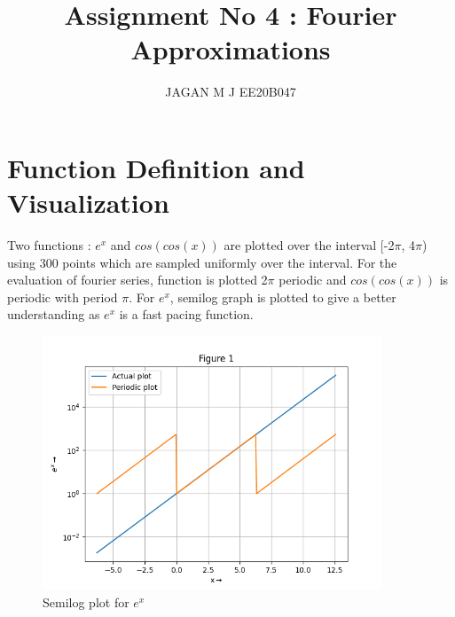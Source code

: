 \documentclass[10pt,a4paper]{article}
\date{}
\begin{document}
\title{Assignment No 4 : Fourier Approximations}
\author{JAGAN M J EE20B047}
\maketitle


\section{Function Definition and Visualization}

Two functions : $e^{x}$ and $cos(cos(x))$ are plotted over the interval [-2$\pi$, 4$\pi$) using 300 points which are sampled uniformly over the interval.
For the evaluation of fourier series, function is plotted 2$\pi$ periodic and $cos(cos(x))$ is periodic with period $\pi$.
For $e^{x}$, semilog graph is plotted to give a better understanding as $e^{x}$ is a fast pacing function.
\begin{figure}[!tbh]
\includegraphics[width = 0.9\textwidth]{1a.png}
\caption{Semilog plot for $e^{x}$}
\end{figure} 
\newline
\newline
\newline
\newline
\newline
\newline
\newline
\newline
\newline
\newline
\newline
\newline
\newline
\end{document}
